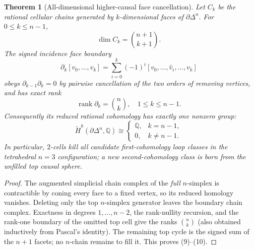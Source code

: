 \documentclass[11pt]{article}
\newtheorem{theorem}{Theorem}
\begin{document}
\begin{theorem}[All-dimensional higher-causal face cancellation]
Let $C_k$ be the rational cellular chains generated by
$k$-dimensional faces of $\partial\Delta^n$. For
$0\le k\le n-1$,
\[
 \dim C_k=\binom{n+1}{k+1}.
\]
The signed incidence face boundary
\[
\partial_k[v_0,\ldots,v_k]
 =\sum_{i=0}^{k}(-1)^i
 [v_0,\ldots,\widehat v_i,\ldots,v_k]
\]
obeys $\partial_{k-1}\partial_k=0$ by pairwise cancellation
of the two orders of removing vertices, and has exact rank
\[
\boxed{\quad\operatorname{rank}\partial_k
 =\binom{n}{k},\quad1\le k\le n-1.\quad}\tag{9}
\]
Consequently its reduced rational cohomology has exactly one
nonzero group:
\[
\boxed{\quad\widetilde H^k(\partial\Delta^n,\mathbb Q)
 \cong\begin{cases}
  \mathbb Q,&k=n-1,\\0,&k\ne n-1.
 \end{cases}\quad}\tag{10}
\]
In particular, $2$-cells \emph{kill} all candidate
first-cohomology loop classes in the tetrahedral $n=3$
configuration; a new second-cohomology class is born
from the unfilled top causal sphere.
\end{theorem}
\begin{proof}
The augmented simplicial chain complex of the \emph{full}
$n$-simplex is contractible by coning every face to a fixed
vertex, so its reduced homology vanishes. Deleting only the
top $n$-simplex generator leaves the boundary chain complex.
Exactness in degrees $1,\ldots,n-2$, the rank-nullity
recursion, and the rank-one boundary of the omitted top cell
give the ranks $\binom nk$ (also obtained inductively from
Pascal's identity). The remaining top cycle is the signed
sum of the $n+1$ facets; no $n$-chain remains to fill it.
This proves (9)--(10).
\end{proof}
\end{document}

